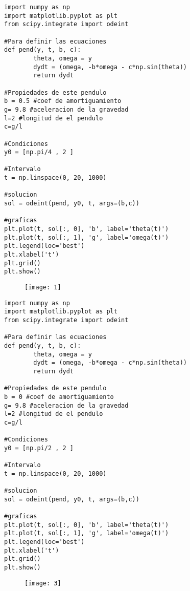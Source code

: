 \documentclass[12pt]{article}
\begin{document}
\pagebreak
\begin{verbatim}
import numpy as np
import matplotlib.pyplot as plt
from scipy.integrate import odeint

#Para definir las ecuaciones
def pend(y, t, b, c):
        theta, omega = y
        dydt = (omega, -b*omega - c*np.sin(theta))
        return dydt
    
#Propiedades de este pendulo   
b = 0.5 #coef de amortiguamiento
g= 9.8 #aceleracion de la gravedad
l=2 #longitud de el pendulo
c=g/l

#Condiciones
y0 = [np.pi/4 , 2 ]

#Intervalo
t = np.linspace(0, 20, 1000)

#solucion 
sol = odeint(pend, y0, t, args=(b,c))

#graficas
plt.plot(t, sol[:, 0], 'b', label='theta(t)')
plt.plot(t, sol[:, 1], 'g', label='omega(t)')
plt.legend(loc='best')
plt.xlabel('t')
plt.grid()
plt.show()
\end{verbatim}

\begin{figure}[H]
\centering
\texttt{[image: 1]}
\end{figure}

\begin{verbatim}
import numpy as np
import matplotlib.pyplot as plt
from scipy.integrate import odeint

#Para definir las ecuaciones
def pend(y, t, b, c):
        theta, omega = y
        dydt = (omega, -b*omega - c*np.sin(theta))
        return dydt
    
#Propiedades de este pendulo   
b = 0 #coef de amortiguamiento
g= 9.8 #aceleracion de la gravedad
l=2 #longitud de el pendulo
c=g/l

#Condiciones
y0 = [np.pi/2 , 2 ]

#Intervalo
t = np.linspace(0, 20, 1000)

#solucion 
sol = odeint(pend, y0, t, args=(b,c))

#graficas
plt.plot(t, sol[:, 0], 'b', label='theta(t)')
plt.plot(t, sol[:, 1], 'g', label='omega(t)')
plt.legend(loc='best')
plt.xlabel('t')
plt.grid()
plt.show()
\end{verbatim}
\begin{figure}[H]
\centering
\texttt{[image: 3]}
\end{figure}
\end{document}
